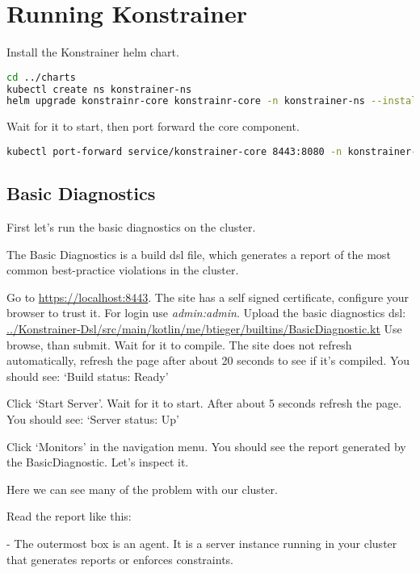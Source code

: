 \section{Running Konstrainer}

Install the Konstrainer helm chart.

\begin{lstlisting}[caption={TODO},language=bash,label=code:bashx]
cd ../charts
kubectl create ns konstrainer-ns
helm upgrade konstrainr-core konstrainr-core -n konstrainer-ns --install
\end{lstlisting}

Wait for it to start, then port forward the core component.

\begin{lstlisting}[caption={TODO},language=bash,label=code:bashx]
kubectl port-forward service/konstrainer-core 8443:8080 -n konstrainer-ns
\end{lstlisting}

\subsection{Basic Diagnostics}

First let's run the basic diagnostics on the cluster.

The Basic Diagnostics is a build dsl file, which generates a report of the most common best-practice violations in the cluster.

Go to \url{https://localhost:8443}. The site has a self signed certificate, configure your browser to trust it. For login use \emph{admin:admin}. Upload the basic diagnostics dsl:
\url{../Konstrainer-Dsl/src/main/kotlin/me/btieger/builtins/BasicDiagnostic.kt}
Use browse, than submit. Wait for it to compile. The site does not refresh automatically, refresh the page after about 20 seconds to see if it's compiled. You should see: `Build status: Ready'

Click `Start Server'. Wait for it to start. After about 5 seconds refresh the page. You should see: `Server status: Up'

Click `Monitors' in the navigation menu. You should see the report generated by the BasicDiagnostic. Let's inspect it.

Here we can see many of the problem with our cluster.

Read the report like this:

- The outermost box is an agent. It is a server instance running in your cluster that generates reports or enforces constraints.


